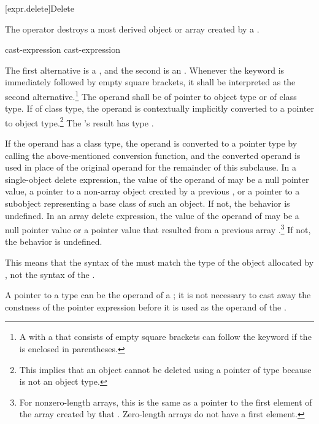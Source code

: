 [expr.delete]{Delete}

\pnum
{}%
%
The  operator destroys a most derived
object or array created by a
.

\begin{bnf}
\br
    \opt{\terminal{::}}  cast-expression\br
    \opt{\terminal{::}}  \terminal{[} \terminal{]} cast-expression
\end{bnf}

The first alternative is a
, and the
second is an .
Whenever the  keyword is immediately followed by empty square
brackets, it shall be interpreted as the second alternative.\footnote{A
 with a 
that consists of empty square brackets can follow the  keyword
if the  is enclosed in parentheses.}
The operand shall be of pointer to object type or of class type. If of
class type, the operand is contextually implicitly converted
to a pointer to object
type.\footnote{This implies that an object
cannot be deleted using a pointer of type
 because  is not an object type.}
The 's result has type
.

\pnum
{}%
If the operand has a class type, the operand is converted to a pointer
type by calling the above-mentioned conversion function, and the
converted operand is used in place of the original operand for the
remainder of this subclause.
In a single-object delete expression, the value of the operand of
 may be a null pointer value, a pointer to a non-array object
created by a previous ,
or a pointer to a
subobject representing a base class of such an
object. If not, the behavior is undefined.
%
In an array delete expression, the value of the operand of 
may be a null pointer value or a pointer value that resulted from
a previous array .\footnote{For nonzero-length
arrays, this is the same as a pointer to the first
element of the array created by that .
Zero-length arrays do not have a first element.}
If not, the behavior is undefined.
\begin{note}
This means that the syntax of the  must
match the type of the object allocated by , not the syntax of the
.
\end{note}
\begin{note}
A pointer to a  type can be the operand of a
; it is not necessary to cast away the
constness of the pointer expression before it is
used as the operand of the .
\end{note}

